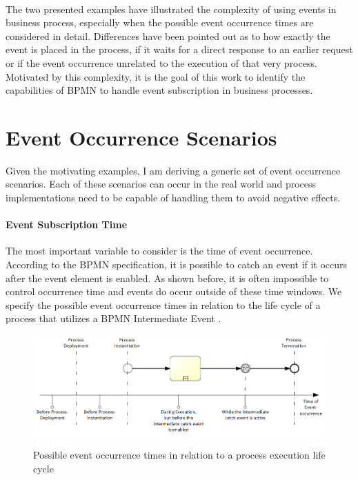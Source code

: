 
\paragraph{}
\noindent
The two presented examples have illustrated the complexity of using events in business process, especially when the possible event occurrence times are considered in detail.
Differences have been pointed out as to how exactly the event is placed in the process, if it waits for a direct response to an earlier request or if the event occurrence unrelated to the execution of that very process.
Motivated by this complexity, it is the goal of this work to identify the capabilities of BPMN to handle event subscription in business processes.



\section{Event Occurrence Scenarios}
Given the motivating examples, I am deriving a generic set of event occurrence scenarios. Each of these scenarios can occur in the real world and process implementations need to be capable of handling them to avoid negative effects.

\paragraph{Event Subscription Time}

The most important variable to consider is the time of event occurrence. 
According to the BPMN specification, it is possible to catch an event if it occurs after the event element is enabled. As shown before, it is often impossible to control occurrence time and events do occur outside of these time windows.
We specify the possible event occurrence times in relation to the life cycle of a process that utilizes a BPMN Intermediate Event .
\begin{figure}[]
	\myfloatalign
	{\includegraphics[width=1\linewidth]{chapters/requirements/timeline-event-occurrence.png}}
	\caption{Possible event occurrence times in relation to a process execution life cycle}\label{fig:occurrence-timeline}
\end{figure}

